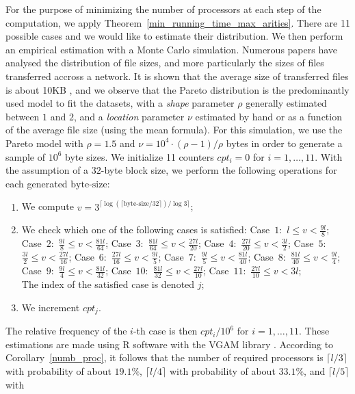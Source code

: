 \documentclass{llncs}
\begin{document}
For the purpose of minimizing the number of processors at each step of the computation, we apply Theorem~\ref{min_running_time_max_arities}. 
There are 11 possible cases and we would like to estimate their distribution. We then perform an empirical estimation with a Monte Carlo simulation.
Numerous papers have analysed the distribution of file sizes, and more particularly the sizes of files transferred accross a network. 
It is shown that the average size of transferred files is about 10KB \cite{TMW97,WAWB05,BC98}, and we observe that
the Pareto distribution
is the predominantly used model \cite{BC98,Dow05,WAWB05,HSBA2003} to fit the datasets, with a \emph{shape} parameter $\rho$ generally estimated between $1$ and $2$,
and a \emph{location} parameter $\nu$ estimated by hand or as a function of the average file size (using the mean formula). For this simulation, 
we use the Pareto model with $\rho=1.5$ and 
$\nu=10^4 \cdot (\rho - 1)/\rho$ bytes in order to generate a sample of $10^6$ byte sizes.
We initialize 11 counters $cpt_i=0$ for $i=1, \ldots, 11$. 
With the assumption of a $32$-byte block size, we perform the following operations for each generated $\textrm{byte-size}$:
\begin{enumerate}
 \item We compute $v=3^{\lceil \log(\lceil \textrm{byte-size}/32 \rceil )/\log 3 \rceil}$;
 \item We check which one of the following cases is satisfied:
 Case~$1$:~$l \leq v < \frac{9l}{8}$;
 Case~$2$:~$\frac{9l}{8} \leq v < \frac{81l}{64}$;
 Case~$3$:~$\frac{81l}{64} \leq v < \frac{27l}{20}$;
 Case~$4$:~$\frac{27l}{20} \leq v < \frac{3l}{2}$;
 Case~$5$:~$\frac{3l}{2} \leq v < \frac{27l}{16}$;
 Case~$6$:~$\frac{27l}{16} \leq v < \frac{9l}{5}$;
 Case~$7$:~$\frac{9l}{5} \leq v < \frac{81l}{40}$;
 Case~$8$:~$\frac{81l}{40} \leq v < \frac{9l}{4}$;
 Case~$9$:~$\frac{9l}{4} \leq v < \frac{81l}{32}$;
 Case~$10$:~$\frac{81l}{32} \leq v < \frac{27l}{10}$;
 Case~$11$:~$\frac{27l}{10} \leq v < 3l$;~\\
 The index of the satisfied case is denoted $j$;
 \item We increment $cpt_j$.
\end{enumerate}
The relative frequency of the $i$-th case is then $cpt_i/10^6$ for $i=1, \ldots, 11$.
These estimations are made using R software \cite{RCTEAM} with the VGAM library \cite{Yee10}.
According to Corollary~\ref{numb_proc},
it follows that the number of required processors is $\lceil l/3 \rceil$ with probability 
of about $19.1\%$, $\lceil l/4 \rceil$
with probability of about $33.1\%$, and $\lceil l/5 \rceil$ with 
\end{document}
